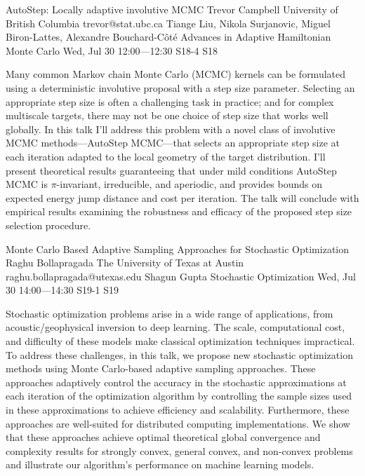 \begin{talk}
  {AutoStep: Locally adaptive involutive MCMC}%
  {Trevor Campbell}%
  {University of British Columbia}%
  {trevor@stat.ubc.ca}%
  {Tiange Liu, Nikola Surjanovic, Miguel Biron-Lattes, Alexandre Bouchard-C\^ot\'e}%
  {Advances in Adaptive Hamiltonian Monte Carlo}%
  {Wed, Jul 30 12:00---12:30}%
  {S18-4}%
  {S18}%
    

\medskip

Many common Markov chain Monte Carlo (MCMC) kernels can be formulated using a deterministic involutive proposal with a step size parameter.  Selecting an appropriate step size is often a challenging task in practice; and for complex multiscale targets, there may not be one choice of step size that works well globally.  In this talk I'll address this problem with a novel class of involutive MCMC methods---AutoStep MCMC---that selects an appropriate step size at each iteration adapted to the local geometry of the target distribution.  I'll present theoretical results guaranteeing that under mild conditions AutoStep MCMC is $\pi$-invariant, irreducible, and aperiodic, and provides bounds on expected energy jump distance and cost per iteration. The talk will conclude with empirical results examining the robustness and efficacy of the proposed step size selection procedure.

\end{talk}

\begin{talk}
  {Monte Carlo Based Adaptive Sampling Approaches for Stochastic Optimization}%
  {Raghu Bollapragada}%
  {The University of Texas at Austin}%
  {raghu.bollapragada@utexas.edu}%
  {Shagun Gupta}%
  {Stochastic Optimization}%
  {Wed, Jul 30 14:00---14:30}%
  {S19-1}%
  {S19}%
    
   
Stochastic optimization problems arise in a wide range of applications, from acoustic/geophysical inversion to deep learning. The scale, computational cost, and difficulty of these models make classical optimization techniques impractical. To address these challenges, in this talk, we propose new stochastic optimization methods using Monte Carlo-based adaptive sampling approaches. These approaches adaptively control the accuracy in the stochastic approximations at each iteration of the optimization algorithm by controlling the sample sizes used in these approximations to achieve efficiency and scalability. Furthermore, these approaches are well-suited for distributed computing implementations. We show that these approaches achieve optimal theoretical global convergence and complexity results for strongly convex, general convex, and non-convex problems and illustrate our algorithm's performance on machine learning models.

\medskip

\end{talk}

